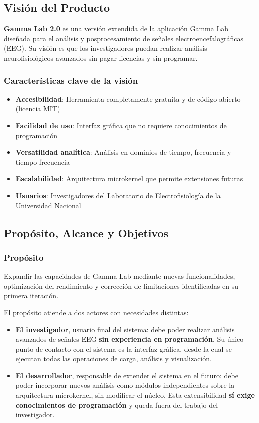 \documentclass{article}
\begin{document}
\subsection{Visión del Producto}
 
\textbf{Gamma Lab 2.0} es una versión extendida de la aplicación Gamma Lab diseñada para el análisis y posprocesamiento de señales electroencefalográficas (EEG). Su visión es que los investigadores puedan realizar análisis neurofisiológicos avanzados sin pagar licencias y sin programar.
 
\subsubsection{Características clave de la visión}
 
\begin{itemize}
    \item \textbf{Accesibilidad}: Herramienta completamente gratuita y de código abierto (licencia MIT)
    \item \textbf{Facilidad de uso}: Interfaz gráfica que no requiere conocimientos de programación
    \item \textbf{Versatilidad analítica}: Análisis en dominios de tiempo, frecuencia y tiempo-frecuencia
    \item \textbf{Escalabilidad}: Arquitectura microkernel que permite extensiones futuras
    \item \textbf{Usuarios}: Investigadores del Laboratorio de Electrofisiología de la Universidad Nacional
\end{itemize}
 
\subsection{Propósito, Alcance y Objetivos}
 
\subsubsection{Propósito}
 
Expandir las capacidades de Gamma Lab mediante nuevas funcionalidades, optimización del rendimiento y corrección de limitaciones identificadas en su primera iteración.

El propósito atiende a dos actores con necesidades distintas:

\begin{itemize}
    \item \textbf{El investigador}, usuario final del sistema: debe poder realizar análisis avanzados de señales EEG \textbf{sin experiencia en programación}. Su único punto de contacto con el sistema es la interfaz gráfica, desde la cual se ejecutan todas las operaciones de carga, análisis y visualización.

    \item \textbf{El desarrollador}, responsable de extender el sistema en el futuro: debe poder incorporar nuevos análisis como módulos independientes sobre la arquitectura microkernel, sin modificar el núcleo. Esta extensibilidad \textbf{sí exige conocimientos de programación} y queda fuera del trabajo del investigador.
\end{itemize}
\end{document}
